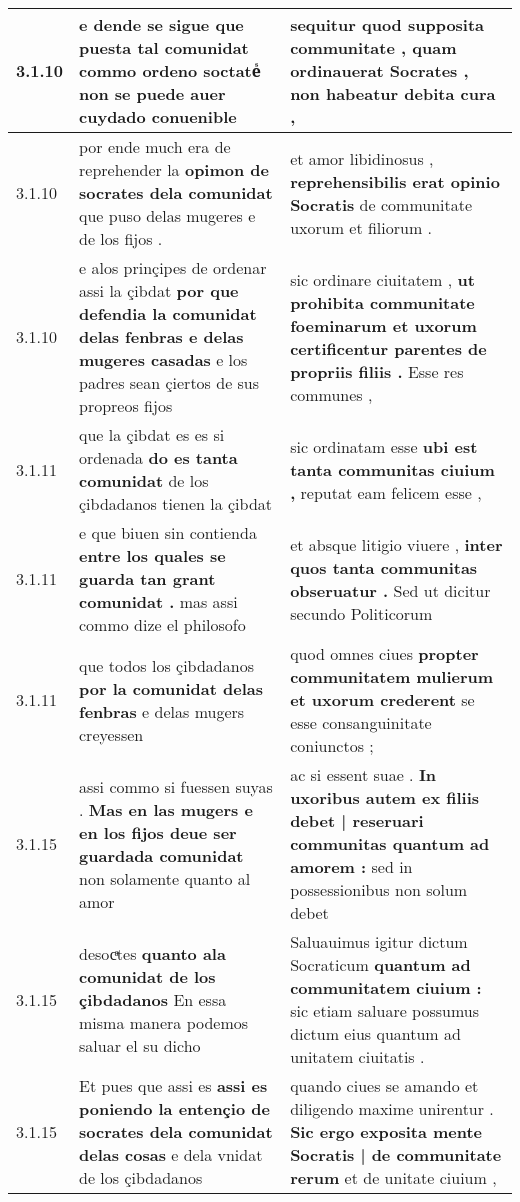 \begin{tabular}{|p{1cm}|p{6.5cm}|p{6.5cm}|}
3.1.10 & e dende se sigue \textbf{ que puesta tal comunidat commo ordeno soctateᷤ } non se puede auer cuydado conuenible & sequitur quod supposita communitate , \textbf{ quam ordinauerat Socrates , } non habeatur debita cura , \\\hline
3.1.10 & por ende much era de reprehender la \textbf{ opimon de socrates dela comunidat } que puso delas mugeres e de los fijos . & et amor libidinosus , \textbf{ reprehensibilis erat opinio Socratis } de communitate uxorum et filiorum . \\\hline
3.1.10 & e alos prinçipes de ordenar assi la çibdat \textbf{ por que defendia la comunidat delas fenbras e delas mugeres casadas } e los padres sean çiertos de sus propreos fijos & sic ordinare ciuitatem , \textbf{ ut prohibita communitate foeminarum et uxorum certificentur parentes de propriis filiis . } Esse res communes , \\\hline
3.1.11 & que la çibdat es es si ordenada \textbf{ do es tanta comunidat } de los çibdadanos tienen la çibdat & sic ordinatam esse \textbf{ ubi est tanta communitas ciuium , } reputat eam felicem esse , \\\hline
3.1.11 & e que biuen sin contienda \textbf{ entre los quales se guarda tan grant comunidat . } mas assi commo dize el philosofo & et absque litigio viuere , \textbf{ inter quos tanta communitas obseruatur . } Sed ut dicitur secundo Politicorum \\\hline
3.1.11 & que todos los çibdadanos \textbf{ por la comunidat delas fenbras } e delas mugers creyessen & quod omnes ciues \textbf{ propter communitatem mulierum et uxorum crederent } se esse consanguinitate coniunctos ; \\\hline
3.1.15 & assi commo si fuessen suyas . \textbf{ Mas en las mugers e en los fijos deue ser guardada comunidat } non solamente quanto al amor & ac si essent suae . \textbf{ In uxoribus autem ex filiis debet | reseruari communitas quantum ad amorem : } sed in possessionibus non solum debet \\\hline
3.1.15 & desocͣtes \textbf{ quanto ala comunidat de los çibdadanos } En essa misma manera podemos saluar el su dicho & Saluauimus igitur dictum Socraticum \textbf{ quantum ad communitatem ciuium : } sic etiam saluare possumus dictum eius quantum ad unitatem ciuitatis . \\\hline
3.1.15 & Et pues que assi es \textbf{ assi es poniendo la entençio de socrates dela comunidat delas cosas } e dela vnidat de los çibdadanos & quando ciues se amando et diligendo maxime unirentur . \textbf{ Sic ergo exposita mente Socratis | de communitate rerum } et de unitate ciuium , \\\hline

\end{tabular}
